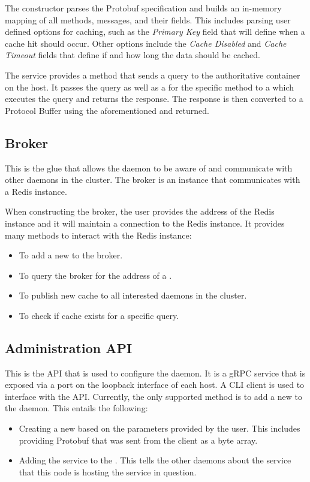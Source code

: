 \documentclass[a4paper]{article}
\begin{document}
The constructor parses the Protobuf specification and builds an in-memory mapping of all methods, messages, and their fields.
This includes parsing user defined options for caching, such as the \textit{Primary Key} field that will define when a cache hit should occur.
Other options include the \textit{Cache Disabled} and \textit{Cache Timeout} fields that define if and how long the data should be cached.

The service provides a method that sends a query to the authoritative container on the host.
It passes the query as well as a \textit{} for the specific method to a \textit{} which executes the query
and returns the response. The response is then converted to a Protocol Buffer using the aforementioned \textit{} and returned.

\subsection{Broker}
\label{sec:broker}

This is the glue that allows the daemon to be aware of and communicate with other daemons in the cluster.
The broker is an instance that communicates with a Redis \cite{redis} instance.

When constructing the broker, the user provides the address of the Redis instance and it will maintain a connection to the Redis instance.
It provides many methods to interact with the Redis instance:
\begin{itemize}
    \item To add a new \textit{} to the broker.
    \item To query the broker for the address of a \textit{}.
    \item To publish new cache to all interested daemons in the cluster.
    \item To check if cache exists for a specific query.
\end{itemize}

\subsection{Administration API}
\label{sec:api}
This is the API that is used to configure the daemon. It is a gRPC service that is exposed via a port on the loopback interface of each host.
A CLI client is used to interface with the API. Currently, the only supported method is to add a new \textit{} to the daemon.
This entails the following:
\begin{itemize}
    \item Creating a new \textit{} based on the parameters provided by the user.
          This includes providing Protobuf that was sent from the client as a byte array.
    \item Adding the service to the \textit{}. This tells the other daemons about the service that this
          node is hosting the service in question.
\end{itemize}
\end{document}

